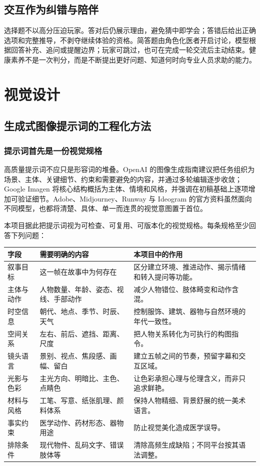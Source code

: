 \documentclass[lang=cn,a4paper,11pt,citestyle=gb7714-2015,bibstyle=gb7714-2015]{elegantpaper}
\begin{document}
\subsection{交互作为纠错与陪伴}

选择题不以高分压迫玩家。答对后仍展示理由，避免猜中即学会；答错后给出正确选项和完整推导，不剥夺继续体验的资格。简答题由角色化医者开启讨论，模型根据回答补充、追问或提醒边界；玩家可跳过，也可在完成一轮交流后主动结束。健康素养不是一次判分，而是不断提出更好问题、知道何时向专业人员求助的能力。

\clearpage
\section{视觉设计}

\subsection{生成式图像提示词的工程化方法}

\subsubsection{提示词首先是一份视觉规格}

高质量提示词不应只是形容词的堆叠。OpenAI 的图像生成指南建议把任务组织为场景、主体、关键细节、约束和需要避免的内容，并通过多轮编辑逐步收敛\cite{openai2026imageprompt}；Google Imagen 将核心结构概括为主体、情境和风格，并强调在初稿基础上逐项增加可验证细节\cite{google2026imagenprompt}。Adobe、Midjourney、Runway 与 Ideogram 的官方资料虽然面向不同模型，也都将清楚、具体、单一而连贯的视觉意图置于首位\cite{adobe2026prompt,midjourney2026prompt,runway2026prompt,ideogram2026prompt}。

本项目据此把提示词视为可检查、可复用、可版本化的视觉规格。每条规格至少回答下列问题：

\begin{longtable}{p{}p{}p{}}
\toprule
字段 & 需要明确的内容 & 本项目中的作用\\
\midrule
叙事目标 & 这一帧在故事中为何存在 & 区分建立环境、推进动作、揭示情绪和转入提问等功能。\\
主体与动作 & 人物数量、年龄、姿态、视线、手部动作 & 减少人物错位、肢体畸变和动作含混。\\
时空信息 & 朝代、地点、季节、时辰、天气 & 控制服饰、建筑、器物与自然环境的年代一致性。\\
空间关系 & 左右、前后、遮挡、距离、尺度 & 把人物关系转化为可执行的构图指令。\\
镜头语言 & 景别、视点、焦段感、画幅、留白 & 建立五帧之间的节奏，预留字幕和交互区域。\\
光影与色彩 & 主光方向、明暗比、主色、点睛色 & 让色彩承担心理与伦理含义，而非只追求鲜艳。\\
材料与风格 & 工笔、写意、纸张肌理、颜料体系 & 保持人物精细、背景舒展的统一美术语言。\\
事实约束 & 医学动作、药材形态、器物用途 & 防止视觉美化造成医学误导。\\
排除条件 & 现代物件、乱码文字、错误肢体等 & 清除高频生成缺陷；不同平台按其语法调整。\\
\bottomrule
\end{longtable}
\end{document}
